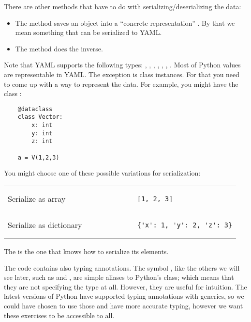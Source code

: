 There are other methods that have to do with serializing/deserializing the data:

\begin{itemize}
    \item The method  saves an object into a ``concrete representation'' \ConcreteRepr.
          By that we mean something that can be serialized to YAML.
    \item The method  does the inverse.
\end{itemize}

Note that YAML supports the following types: , , , ,
, , .
Most of Python values are representable in YAML.
The exception is class instances.
For that you need to come up with a way to represent the data.
For example, you might have the class :

\begin{verbatim}
    @dataclass
    class Vector:
        x: int
        y: int
        z: int

    a = V(1,2,3)
\end{verbatim}

You might choose one of these possible variations for serialization:

\begin{tabular}{ll}
    Serialize as array      &
    \begin{minipage}{4cm}
        \begin{verbatim}
            [1, 2, 3]
        \end{verbatim}
    \end{minipage} \\
    Serialize as dictionary &
    \begin{minipage}{4cm}
        \begin{verbatim}
            {'x': 1, 'y': 2, 'z': 3}
        \end{verbatim}
    \end{minipage}
\end{tabular}

The \Setoid is the one that knows how to serialize its elements.

The code contains also typing annotations.
The symbol \Element, like the others we will see later, such as \Object and \Morphism, are simple aliases to Python's  class; which means that they are not specifying the type at all.
However, they are useful for intuition.
The latest versions of Python have supported typing annotations with generics, so we could have chosen to use those and have more accurate typing, however we want these exercises to be accessible to all.

